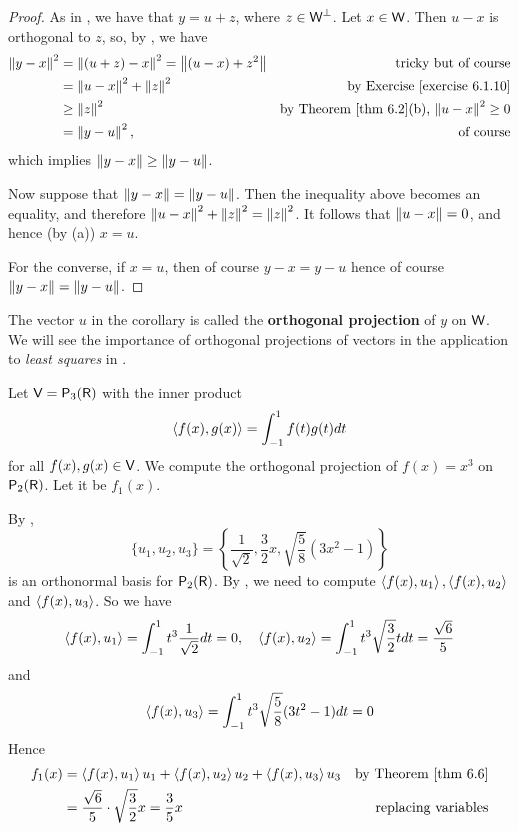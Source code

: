 \begin{proof}
As in , we have that \(y = u + z\), where \(z \in \textsf{W}^{\perp}\).
Let \(x \in \textsf{W}\).
Then \(u - x\) is orthogonal to \(z\), so, by , we have
\begin{align*}
    \norm{y - x}^2 & = \norm{(u + z) - x}^2 = \norm{(u - x) + z^2} & \text{tricky but of course} \\
        & = \norm{u - x}^2 + \norm{z}^2 & \text{by \EXEC{6.1.10}} \\
        & \ge \norm{z}^2 & \text{by \THM{6.2}(b), \(\norm{u - x}^2 \ge 0\)} \\
        & = \norm{y - u}^2, & \text{of course}
\end{align*}
which implies \(\left\lVert y - x\right\rVert \ge \left\lVert y - u\right\rVert\).

Now suppose that \(\left\lVert y - x\right\rVert = \left\lVert y - u\right\rVert\).
Then the inequality above becomes an equality, and therefore \(\left\lVert u - x\right\rVert^2 + \left\lVert z\right\rVert^2 = \left\lVert z\right\rVert^2\).
It follows that \(\left\lVert u - x\right\rVert = 0\), and hence (by (a)) \(x = u\).

For the converse, if \(x = u\), then of course \(y - x = y - u\) hence of course \(\left\lVert y - x\right\rVert = \left\lVert y - u\right\rVert\).
\end{proof}

\begin{additional definition} \label{adef 1.3}
The vector \(u\) in the corollary is called the \textbf{orthogonal projection} of \(y\) on \(\textsf{W}\).
We will see the importance of orthogonal projections of vectors in the application to \emph{least squares} in .
\end{additional definition}

\begin{example} \label{example 6.2.10}
Let \(\textsf{V} = \textsf{P}_3(\textsf{R})\) with the inner product
\[
    \left< f(x),g(x) \right> = \int_{-1}^{1} f(t)g(t) dt
\]
for all \(f(x), g(x) \in \textsf{V}\).
We compute the orthogonal projection of \(f(x) = x^3\) on \(\textsf{P}_2(\textsf{R})\).
Let it be \(f_1(x)\).

By ,
\[
    \{ u_1, u_2, u_3 \} = \left\{ \frac{1}{\sqrt{2}}, \frac{3}{2} x, \sqrt{\frac{5}{8}}(3x^2 - 1) \right\}
\]
is an orthonormal basis for \(\textsf{P}_2(\textsf{R})\).
By , we need to compute \(\left< f(x), u_1 \right>, \left< f(x), u_2 \right>\) and \(\left< f(x), u_3 \right>\).
So we have
\[
    \left< f(x), u_1 \right> = \int_{-1}^{1} t^3 \frac{1}{\sqrt{2}} dt = 0,
    \quad \left< f(x), u_2 \right> = \int_{-1}^{1} t^3 \sqrt{\frac{3}{2}} t dt = \frac{\sqrt{6}}{5}
\]
and
\[
    \left< f(x), u_3 \right> = \int_{-1}^{1} t^{3} \sqrt{\frac{5}{8}} (3 t^2 - 1) dt = 0
\]
Hence
\begin{align*}
    f_{1}(x) & = \LG f(x), u_1 \RG u_1 + \LG f(x), u_2 \RG u_2 + \LG f(x), u_3 \RG u_3 & \text{by \THM{6.6}} \\
        & = \frac{\sqrt{6}}{5} \cdot \sqrt{\frac{3}{2}}x = \frac{3}{5} x & \text{replacing variables}
\end{align*}
\end{example}


